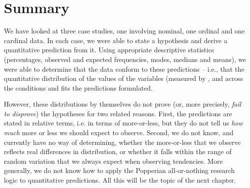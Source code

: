 \section{Summary}
\label{sec:datatypessummary}

We have looked at three case studies, one involving nominal,  one ordinal  and one cardinal  data. In each case, we were able to state a hypothesis  and derive a quantitative  prediction from it. Using appropriate descriptive  statistics  (percentages, observed and expected  frequencies, modes,  medians  and means),  we were able to determine that the data conform to these predictions -- i.e., that the quantitative distribution  of the values of the variables   (measured  by ,  and   across the conditions   and  fits the predictions formulated.

However, these distributions  by themselves do not prove (or, more precisely, \textit{fail to disprove}) the hypotheses  for two related reasons. First, the predictions are stated in relative terms, i.e. in terms of more\hyp{}or\hyp{}less, but they do not tell us \textit{how much} more or less we should expect to observe. Second, we do not know, and currently have no way of determining, whether the more\hyp{}or\hyp{}less that we observe reflects real differences in distribution,  or whether it falls within the range of random  variation  that we always expect when observing tendencies. More generally, we do not know how to apply the Popperian all\hyp{}or\hyp{}nothing research logic to quantitative  predictions. All this will be the topic of the next chapter.
